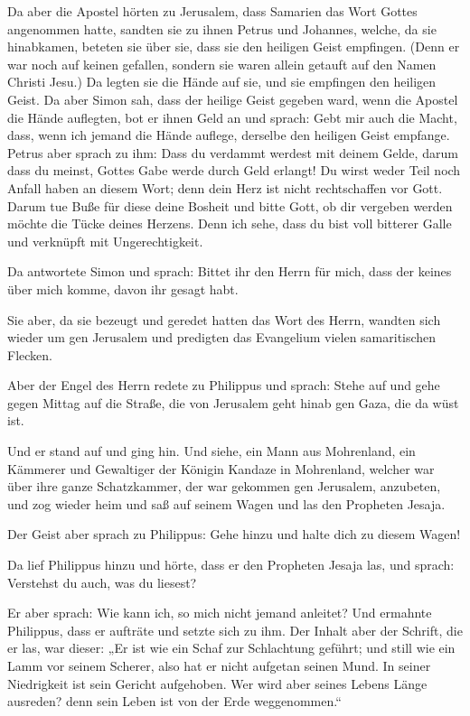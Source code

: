  Da aber die Apostel hörten zu Jerusalem, dass Samarien das
Wort Gottes angenommen hatte, sandten sie zu ihnen Petrus und Johannes,
 welche, da sie hinabkamen, beteten sie über sie, dass sie
den heiligen Geist empfingen.  (Denn er war noch auf keinen
gefallen, sondern sie waren allein getauft auf den Namen Christi Jesu.)
 Da legten sie die Hände auf sie, und sie empfingen den
heiligen Geist.  Da aber Simon sah, dass der heilige Geist
gegeben ward, wenn die Apostel die Hände auflegten, bot er ihnen Geld an
 und sprach: Gebt mir auch die Macht, dass, wenn ich jemand
die Hände auflege, derselbe den heiligen Geist empfange. 
Petrus aber sprach zu ihm: Dass du verdammt werdest mit deinem Gelde,
darum dass du meinst, Gottes Gabe werde durch Geld erlangt!
 Du wirst weder Teil noch Anfall haben an diesem Wort; denn
dein Herz ist nicht rechtschaffen vor Gott.  Darum tue Buße
für diese deine Bosheit und bitte Gott, ob dir vergeben werden möchte
die Tücke deines Herzens.  Denn ich sehe, dass du bist voll
bitterer Galle und verknüpft mit Ungerechtigkeit.

 Da antwortete Simon und sprach: Bittet ihr den Herrn für
mich, dass der keines über mich komme, davon ihr gesagt habt.

 Sie aber, da sie bezeugt und geredet hatten das Wort des
Herrn, wandten sich wieder um gen Jerusalem und predigten das Evangelium
vielen samaritischen Flecken.

 Aber der Engel des Herrn redete zu Philippus und sprach:
Stehe auf und gehe gegen Mittag auf die Straße, die von Jerusalem geht
hinab gen Gaza, die da wüst ist.

 Und er stand auf und ging hin. Und siehe, ein Mann aus
Mohrenland, ein Kämmerer und Gewaltiger der Königin Kandaze in
Mohrenland, welcher war über ihre ganze Schatzkammer, der war gekommen
gen Jerusalem, anzubeten,  und zog wieder heim und saß auf
seinem Wagen und las den Propheten Jesaja.

 Der Geist aber sprach zu Philippus: Gehe hinzu und halte
dich zu diesem Wagen!

 Da lief Philippus hinzu und hörte, dass er den Propheten
Jesaja las, und sprach: Verstehst du auch, was du liesest?

 Er aber sprach: Wie kann ich, so mich nicht jemand
anleitet? Und ermahnte Philippus, dass er aufträte und setzte sich zu
ihm.  Der Inhalt aber der Schrift, die er las, war dieser:
„Er ist wie ein Schaf zur Schlachtung geführt; und still wie ein Lamm
vor seinem Scherer, also hat er nicht aufgetan seinen Mund.
 In seiner Niedrigkeit ist sein Gericht aufgehoben. Wer
wird aber seines Lebens Länge ausreden? denn sein Leben ist von der Erde
weggenommen.``

